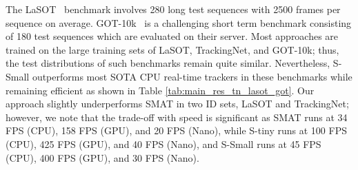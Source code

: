   The LaSOT~\cite{fan2021lasot} benchmark involves 280 long test sequences with 2500 frames per sequence on average.
  GOT-10k~\cite{Huang2021} is a challenging short term benchmark consisting of 180 test sequences which are evaluated on their server. Most approaches are trained on the large training sets of LaSOT, TrackingNet, and GOT-10k; thus, the test distributions of such benchmarks remain quite similar. 
  Nevertheless, S-Small outperforms most SOTA CPU real-time trackers in these benchmarks while remaining efficient as shown in Table \ref{tab:main_res_tn_lasot_got}. Our approach slightly underperforms SMAT
  in two ID sets, LaSOT and TrackingNet; however, we note that the trade-off with speed is significant as SMAT runs at 34 FPS (CPU), 158 FPS (GPU), and 20 FPS (Nano), while S-tiny runs at 100 FPS (CPU), 425 FPS (GPU), and 40 FPS (Nano), and S-Small runs at 45 FPS (CPU), 400 FPS (GPU), and 30 FPS (Nano). 
  
